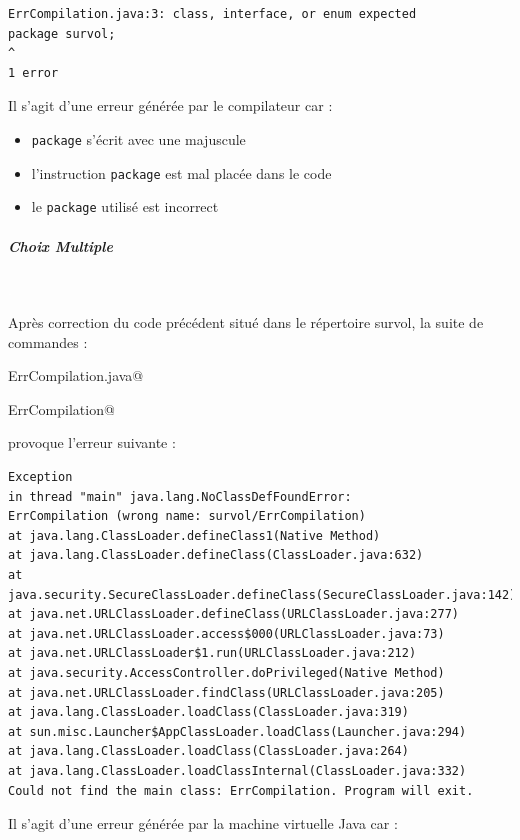 \documentclass[11pt,a4paper]{article}
\begin{document}
            \par
        \begin{scriptsize}\begin{verbatim}
ErrCompilation.java:3: class, interface, or enum expected
package survol;
^
1 error
							\end{verbatim}\end{scriptsize}
								Il s'agit d'une erreur g\'en\'er\'ee par le compilateur \verb@javac@ car :
							
            \par
        
            \begin{itemize} 
        
            \item[ \ding{"6D} ] \verb|package| s'\'ecrit avec une majuscule
        
            \item[ \ding{"6D} ] l'instruction \verb|package| est mal plac\'ee dans le code
        
            \item[ \ding{"6D} ] le \verb|package| utilis\'e est incorrect
        
            \end{itemize} 
        
			
		\subparagraph{Choix Multiple } 
		
                \textcolor{white}{.} \par
            
							  Apr\`es correction du code pr\'ec\'edent situ\'e dans le r\'epertoire survol,
							  la suite de commandes :
              
            \par
        \verb@javac ErrCompilation.java@
            \par
        \verb@java ErrCompilation@
            \par
        
							provoque l'erreur suivante :
							\begin{scriptsize}\begin{verbatim}
Exception
in thread "main" java.lang.NoClassDefFoundError:
ErrCompilation (wrong name: survol/ErrCompilation)
at java.lang.ClassLoader.defineClass1(Native Method)
at java.lang.ClassLoader.defineClass(ClassLoader.java:632)
at java.security.SecureClassLoader.defineClass(SecureClassLoader.java:142)
at java.net.URLClassLoader.defineClass(URLClassLoader.java:277)
at java.net.URLClassLoader.access$000(URLClassLoader.java:73)
at java.net.URLClassLoader$1.run(URLClassLoader.java:212)
at java.security.AccessController.doPrivileged(Native Method)
at java.net.URLClassLoader.findClass(URLClassLoader.java:205)
at java.lang.ClassLoader.loadClass(ClassLoader.java:319)
at sun.misc.Launcher$AppClassLoader.loadClass(Launcher.java:294)
at java.lang.ClassLoader.loadClass(ClassLoader.java:264)
at java.lang.ClassLoader.loadClassInternal(ClassLoader.java:332)
Could not find the main class: ErrCompilation. Program will exit.
							\end{verbatim}\end{scriptsize}
								Il s'agit d'une erreur g\'en\'er\'ee par la machine virtuelle Java car :
							
\end{document}
